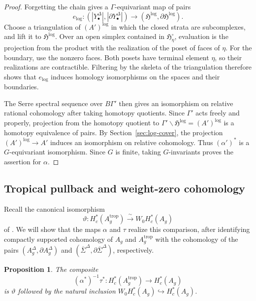 \documentclass[12 pt]{amsart}
\newcommand{\fH}{\mathfrak H}
\newcommand{\trop}{\mathrm{trop}}
\newcommand{\<}{\langle}
\renewcommand{\>}{\rangle}
\newtheorem{proposition}[theorem]{Proposition}
\theoremstyle{definition}
\begin{document}
\begin{proof}
Forgetting the chain gives a $\Gamma$-equivariant map of pairs
\[
e_{\log} \colon (|Y_\bullet^\Delta|, |\partial Y_\bullet^\Delta|)
\longrightarrow (\fH^{\log}, \partial \fH^{\log}).
\]
Choose a triangulation of $(A')^{\log}$ in which the closed strata are subcomplexes, and lift it to $\fH^{\log}$. Over an open simplex contained in $\fH_\eta^\circ$, evaluation is the projection from the product with the realization of the poset of faces of $\eta$. For the boundary, use the nonzero faces. Both posets have terminal element $\eta$, so their realizations are contractible. Filtering by the skeleta of the triangulation therefore shows that $e_{\log}$ induces homology isomorphisms on the spaces and their boundaries.

The Serre spectral sequence over $B\Gamma'$ then gives an isomorphism on relative rational cohomology after taking homotopy quotients. Since $\Gamma'$ acts freely and properly, projection from the homotopy quotient to $\Gamma' \backslash \fH^{\log} = (A')^{\log}$ is a homotopy equivalence of pairs. By Section~\ref{sec:log-cover}, the projection $(A')^{\log} \to A'$ induces an isomorphism on relative cohomology. Thus $(\alpha')^*$ is a $G$-equivariant isomorphism. Since $G$ is finite, taking $G$-invariants proves the assertion for $\alpha$.
\end{proof}

\subsection{Tropical pullback and weight-zero cohomology}\label{sec:incidence-weight-zero}

Recall the canonical isomorphism
\[
\vartheta \colon H_c^*(A_g^\trop) \xrightarrow{\ \sim \ } W_0 H_c^*(A_g)
\]
of \cite[Proposition~2.1]{BCGP}. We will show that the maps $\alpha$ and $\tau$ realize this comparison, after identifying compactly supported cohomology of $A_g$ and $A_g^\trop$ with the cohomology of the pairs $(A_g^\Delta, \partial A_g^\Delta)$ and $(\overline\Sigma^\Delta, \partial\overline\Sigma^\Delta)$, respectively.

\begin{proposition}\label{prop:incidence-weight-zero}
The composite
\[
(\alpha^*)^{-1}\tau^* \colon H_c^*(A_g^\trop) \longrightarrow H_c^*(A_g)
\]
is $\vartheta$ followed by the natural inclusion $W_0 H_c^*(A_g) \hookrightarrow H_c^*(A_g)$.
\end{proposition}
\end{document}

